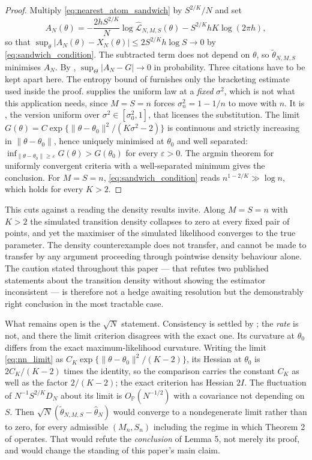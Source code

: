 \documentclass[11pt]{article}
\theoremstyle{definition}
\newcommand{\Pp}{\mathbb{P}}
\newcommand{\Op}{O_{\Pp}}
\newcommand{\thetao}{\theta_0}
\begin{document}
\begin{proof}
Multiply \eqref{eq:nearest_atom_sandwich} by $S^{2/K}/N$ and set
\[
A_N(\theta)=-\frac{2hS^{2/K}}{N}\log\widehat{\mathcal L}_{N,M,S}(\theta)-S^{2/K}hK\log(2\pi h),
\]
so that $\sup_\theta\lvert A_N(\theta)-X_N(\theta)\rvert\le2S^{2/K}h\log S\to0$ by \eqref{eq:sandwich_condition}. The subtracted term does not depend on $\theta$, so $\widetilde\theta_{N,M,S}$ minimises $A_N$. By , $\sup_\Theta\lvert A_N-G\rvert\to0$ in probability. Three citations have to be kept apart here. The entropy bound of  furnishes only the bracketing estimate used inside the proof.  supplies the uniform law at a \emph{fixed} $\sigma^2$, which is not what this application needs, since $M=S=n$ forces $\sigma_n^2=1-1/n$ to move with $n$. It is , the version uniform over $\sigma^2\in[\sigma_0^2,1]$, that licenses the substitution. The limit $G(\theta)=C\exp\{\lVert\theta-\thetao\rVert^2/(K\sigma^2-2)\}$ is continuous and strictly increasing in $\lVert\theta-\thetao\rVert$, hence uniquely minimised at $\thetao$ and well separated: $\inf_{\lVert\theta-\thetao\rVert\ge\varepsilon}G(\theta)>G(\thetao)$ for every $\varepsilon>0$. The argmin theorem for uniformly convergent criteria with a well-separated minimum gives the conclusion. For $M=S=n$, \eqref{eq:sandwich_condition} reads $n^{1-2/K}\gg\log n$, which holds for every $K>2$.
\end{proof}

This cuts against a reading the density results invite. Along $M=S=n$ with $K>2$ the simulated transition density collapses to zero at every fixed pair of points, and yet the maximiser of the simulated likelihood converges to the true parameter. The density counterexample does not transfer, and cannot be made to transfer by any argument proceeding through pointwise density behaviour alone. The caution stated throughout this paper --- that  refutes two published statements about the transition density without showing the estimator inconsistent --- is therefore not a hedge awaiting resolution but the demonstrably right conclusion in the most tractable case.

What remains open is the $\sqrt N$ statement. Consistency is settled by ; the \emph{rate} is not, and there the limit criterion disagrees with the exact one. Its curvature at $\thetao$ differs from the exact maximum-likelihood curvature. Writing the limit \eqref{eq:nn_limit} as $C_K\exp\{\lVert\theta-\thetao\rVert^2/(K-2)\}$, its Hessian at $\thetao$ is $2C_K/(K-2)$ times the identity, so the comparison carries the constant $C_K$ as well as the factor $2/(K-2)$; the exact criterion has Hessian $2I$. The fluctuation of $N^{-1}S^{2/K}D_N$ about its limit is $\Op(N^{-1/2})$ with a covariance not depending on $S$. Then $\sqrt N(\widetilde\theta_{N,M,S}-\widehat\theta_N)$ would converge to a nondegenerate limit rather than to zero, for every admissible $(M_n,S_n)$ including the regime in which Theorem 2 of \citet{BrandtSantaClara2002} operates. That would refute the \emph{conclusion} of Lemma 5, not merely its proof, and would change the standing of this paper's main claim.
\end{document}
